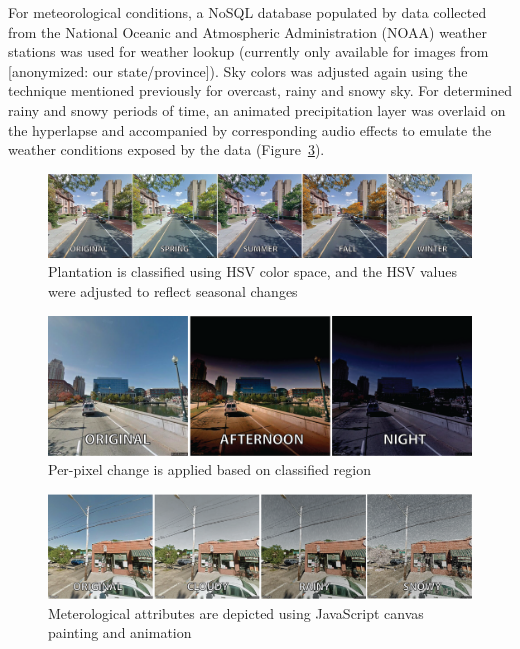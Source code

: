 \documentclass{sigchi}
\begin{document}
For meteorological conditions, a NoSQL database populated by data collected from the National Oceanic and Atmospheric Administration (NOAA) weather stations was used for weather lookup (currently only available for images from [anonymized: our state/province]). Sky colors was adjusted again using the technique mentioned previously for overcast, rainy and snowy sky. For determined rainy and snowy periods of time, an animated precipitation layer was overlaid on the hyperlapse and accompanied by corresponding audio effects to emulate the weather conditions exposed by the data (Figure~\ref{fig:weather}).


\begin{figure}
   \centering
     \includegraphics[width=1\linewidth]{Rewind-seasons2}
     \caption{Plantation is classified using HSV color space, and the HSV values were adjusted to reflect seasonal changes}
     \label{fig:season}
\end{figure}

\begin{figure}
   \centering
     \includegraphics[width=1\linewidth]{Rewind-time_of_day2}
     \caption{Per-pixel change is applied based on classified region}
     \label{fig:timeofday}
\end{figure}

\begin{figure}
   \centering
     \includegraphics[width=1\linewidth]{Rewind-weather}
     \caption{Meterological attributes are depicted using JavaScript canvas painting and animation}
     \label{fig:weather}
\end{figure}
\end{document}
